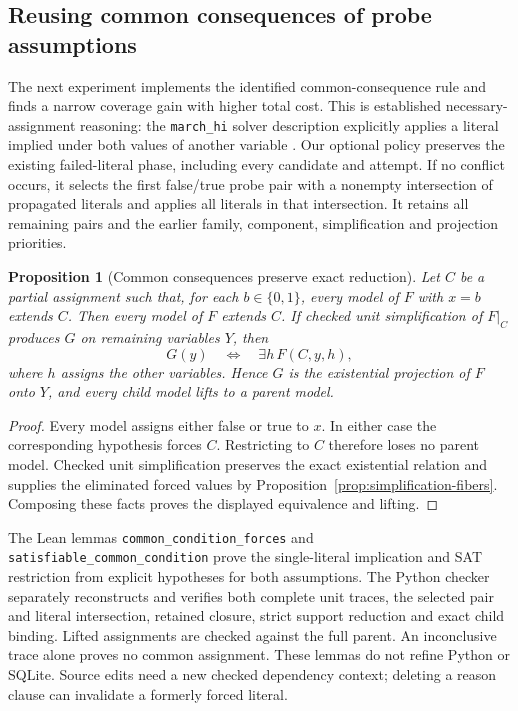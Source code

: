 \documentclass[11pt,a4paper]{article}
\numberwithin{equation}{section}
\theoremstyle{plain}
\newtheorem{proposition}[lemma]{Proposition}
\theoremstyle{definition}
\theoremstyle{remark}
\begin{document}
\subsection{Reusing common consequences of probe assumptions}
\label{sec:common-probe-consequences}

The next experiment implements the identified common-consequence rule and finds a narrow coverage gain with higher total cost. This is established necessary-assignment reasoning: the \texttt{march\_hi} solver description explicitly applies a literal implied under both values of another variable \citep{heule2009marchhi}. Our optional policy preserves the existing failed-literal phase, including every candidate and attempt. If no conflict occurs, it selects the first false/true probe pair with a nonempty intersection of propagated literals and applies all literals in that intersection. It retains all remaining pairs and the earlier family, component, simplification and projection priorities.

\begin{proposition}[Common consequences preserve exact reduction]
\label{prop:common-probe-consequences}
Let $C$ be a partial assignment such that, for each $b\in\{0,1\}$, every model of $F$ with $x=b$ extends $C$. Then every model of $F$ extends $C$. If checked unit simplification of $F\vert_C$ produces $G$ on remaining variables $Y$, then
\[
G(y)\quad\Longleftrightarrow\quad\exists h\,F(C,y,h),
\]
where $h$ assigns the other variables. Hence $G$ is the existential projection of $F$ onto $Y$, and every child model lifts to a parent model.
\end{proposition}
\begin{proof}
Every model assigns either false or true to $x$. In either case the corresponding hypothesis forces $C$. Restricting to $C$ therefore loses no parent model. Checked unit simplification preserves the exact existential relation and supplies the eliminated forced values by Proposition~\ref{prop:simplification-fibers}. Composing these facts proves the displayed equivalence and lifting.
\end{proof}

The Lean lemmas \texttt{common\_condition\_forces} and \texttt{satisfiable\_common\_condition} prove the single-literal implication and SAT restriction from explicit hypotheses for both assumptions. The Python checker separately reconstructs and verifies both complete unit traces, the selected pair and literal intersection, retained closure, strict support reduction and exact child binding. Lifted assignments are checked against the full parent. An inconclusive trace alone proves no common assignment. These lemmas do not refine Python or SQLite. Source edits need a new checked dependency context; deleting a reason clause can invalidate a formerly forced literal.
\end{document}
